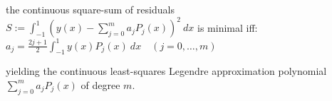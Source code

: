 the continuous square-sum of residuals $S:=\int_{-1}^1\left(y(x)-\sum_{j=0}^ma_jP_j(x)\right)^2\ dx$
is minimal iff:
\colorbox{shadecolor}{$
    \displaystyle
    a_j = \frac{2j+1}{2}\int_{-1}^1 y(x)P_j(x)\ dx\quad(j=0,\ldots,m)
$}

yielding the continuous least-squares Legendre approximation polynomial $\sum_{j=0}^m a_jP_j(x)$ of degree $m$.
